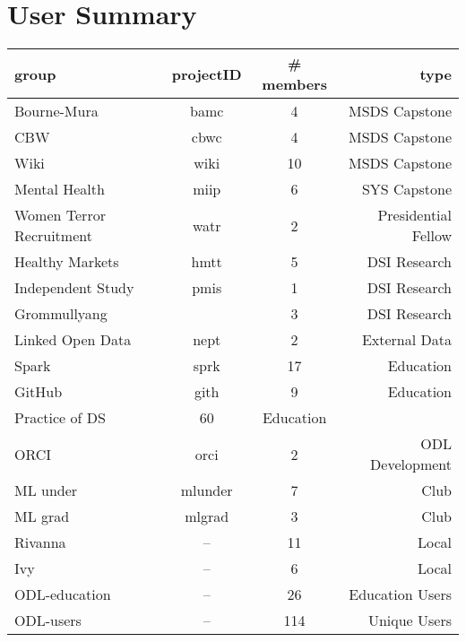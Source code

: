 \section{User Summary}
\begin{center}
\begin{tabular}{lccr}
\hline
\hline
group & projectID & \# members & type \\
\hline
\hline
Bourne-Mura & bamc & 4 & MSDS Capstone \\
CBW & cbwc & 4 & MSDS Capstone\\
Wiki & wiki & 10 & MSDS Capstone\\
Mental Health & miip & 6 & SYS Capstone\\
\hline
Women Terror Recruitment & watr & 2 & Presidential Fellow\\
\hline
Healthy Markets & hmtt & 5 & DSI Research\\
Independent Study & pmis & 1 & DSI Research\\
Grommullyang & & 3 & DSI Research\\
\hline
Linked Open Data   & nept & 2 & External Data\\
\hline
Spark & sprk & 17 & Education \\
GitHub & gith & 9 & Education \\
Practice of DS & 60 & Education \\ 
\hline
ORCI & orci & 2 & ODL Development\\
\hline
ML under & mlunder & 7 & Club\\
ML grad & mlgrad & 3 & Club\\
\hline
Rivanna & -- & 11 & Local\\
Ivy & -- & 6 & Local\\
\hline
\hline
ODL-education  & -- & 26 & Education Users\\
ODL-users & -- & 114 & Unique Users\\
\hline
\hline
\end{tabular}
\end{center}

